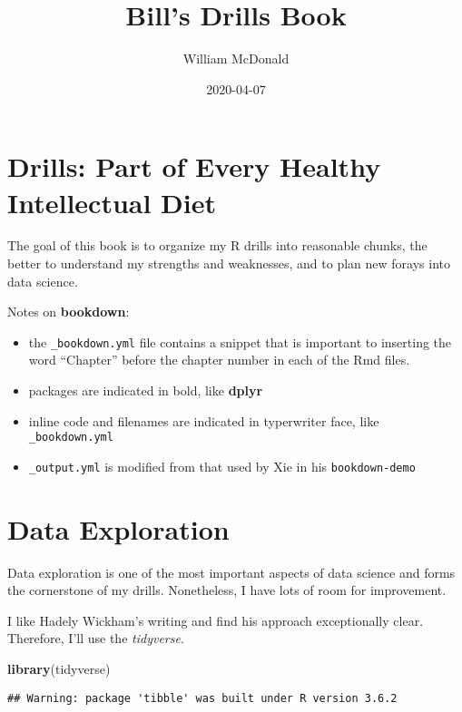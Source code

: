 \documentclass[]{book}
\title{Bill's Drills Book}
\author{William McDonald}
\date{2020-04-07}
\newenvironment{Shaded}{\begin{snugshade}}{\end{snugshade}}
\newcommand{\KeywordTok}[1]{\textcolor[rgb]{0.13,0.29,0.53}{\textbf{#1}}}
\newcommand{\NormalTok}[1]{#1}
\providecommand{\tightlist}{%
  \setlength{\itemsep}{0pt}\setlength{\parskip}{0pt}}
\begin{document}
\maketitle

{
\setcounter{tocdepth}{1}
\tableofcontents
}
\hypertarget{intro}{%
\chapter{Drills: Part of Every Healthy Intellectual Diet}\label{intro}}

The goal of this book is to organize my R drills into reasonable chunks, the better to understand my strengths and weaknesses, and to plan new forays into data science.

Notes on \textbf{bookdown}:

\begin{itemize}
\tightlist
\item
  the \texttt{\_bookdown.yml} file contains a snippet that is important to inserting the word ``Chapter'' before the chapter number in each of the Rmd files.
\item
  packages are indicated in bold, like \textbf{dplyr}
\item
  inline code and filenames are indicated in typerwriter face, like \texttt{\_bookdown.yml}
\item
  \texttt{\_output.yml} is modified from that used by Xie in his \texttt{bookdown-demo} \citep{R-bookdown}
\end{itemize}

\hypertarget{dataexploration}{%
\chapter{Data Exploration}\label{dataexploration}}

Data exploration is one of the most important aspects of data science and forms the cornerstone of my drills. Nonetheless, I have lots of room for improvement.

I like Hadely Wickham's writing and find his approach exceptionally clear. Therefore, I'll use the \emph{tidyverse}.

\begin{Shaded}
\begin{Highlighting}[]
\KeywordTok{library}\NormalTok{(tidyverse)}
\end{Highlighting}
\end{Shaded}

\begin{verbatim}
## Warning: package 'tibble' was built under R version 3.6.2
\end{verbatim}
\end{document}
